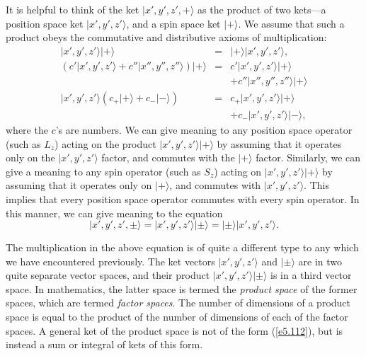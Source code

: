 It is helpful to think of the ket $|x', y', z', +\rangle$ as the product
of two kets---a position space ket $|x', y', z'\rangle$, and
a spin space ket $|+\rangle$. We assume that such a product obeys
the commutative and distributive axioms of multiplication:
\begin{eqnarray}
|x', y', z'\rangle |+\rangle &=& |+\rangle |x', y', z'\rangle,\\[0.5ex]
\left(c' |x', y', z'\rangle + c''| x'', y'', z''\rangle\right)
|+\rangle &=& c' |x', y', z'\rangle |+\rangle \nonumber\\[0.5ex]
&&+ c'' |x'', y'', z''\rangle |+\rangle
\\[0.5ex]
|x', y', z'\rangle\left(c_+ |+\rangle + c_- |-\rangle\right)&=& c_+ 
|x', y', z'\rangle|+\rangle\nonumber\\[0.5ex]
&& + c_-|x', y', z'\rangle|-\rangle,
\end{eqnarray}
where the $c$'s are numbers. We can give meaning to any
position space operator (such as $L_z$)  acting on the product $|x', y', z'\rangle
|+\rangle$ by assuming that it operates only on the $|x', y', z'\rangle$
factor, and commutes with the $|+\rangle$ factor. 
Similarly, we can give a meaning to any spin operator  (such as $S_z$) acting
on $|x', y', z'\rangle
|+\rangle$ by assuming that it operates only on $|+\rangle$, and
commutes with $|x', y', z'\rangle$. This implies that every position
space operator
commutes with every spin operator. In this manner, we can give
meaning to the equation
\begin{equation}\label{e5.112}
 |x', y', z', \pm\rangle = |x', y', z'\rangle| \pm\rangle = | \pm\rangle
|x', y', z'\rangle.
\end{equation}

The multiplication in the above equation is of quite a different type to
any which we have encountered previously. The ket vectors $|x',y', z'\rangle$ and
$|\pm\rangle$ are in two quite separate vector spaces, and their product
$|x',y', z'\rangle|\pm\rangle$ is in a third vector space. 
In mathematics, the latter space
is termed the {\em product space} of the former spaces, which are
termed {\em factor spaces}.  The number of
dimensions of a product space is equal to the product of the number of dimensions
of each of the factor spaces. A general ket of the product space is not
of the form (\ref{e5.112}), but is instead a sum or integral of kets of this form. 

